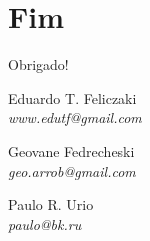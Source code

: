 \section*{Fim}

\begin{frame}
	\begin{center}
		\Huge{Obrigado!}

		\small

	\end{center}

	\small Eduardo T. Feliczaki \\
	\footnotesize{  \textsl{www.edutf@gmail.com} }

    \vspace{20px}
	\small Geovane Fedrecheski \\
	\footnotesize{  \textsl{geo.arrob@gmail.com} }

    \vspace{20px}
	\small Paulo R. Urio \\ \vspace{-5px}
	\footnotesize{  \textsl{paulo@bk.ru} }
\end{frame}

